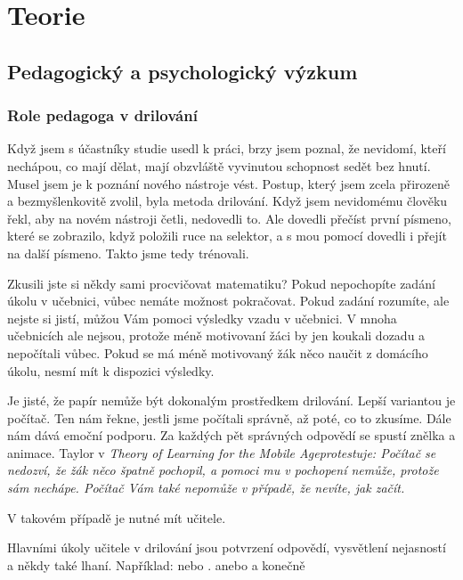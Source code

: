 \chapter{Teorie}

\section{Pedagogický a psychologický výzkum}

\subsection{Role pedagoga v drilování}

Když jsem s účastníky studie usedl k práci, brzy jsem poznal, že nevidomí, kteří nechápou, co mají dělat, mají obzvláště vyvinutou schopnost sedět bez hnutí.  Musel jsem je k poznání nového nástroje vést.  Postup, který jsem zcela přirozeně a bezmyšlenkovitě zvolil, byla metoda drilování.  Když jsem nevidomému člověku řekl, aby na novém nástroji četli, nedovedli to.  Ale dovedli přečíst první písmeno, které se zobrazilo, když položili ruce na selektor, a s mou pomocí dovedli i přejít na další písmeno.  Takto jsme tedy trénovali.

Zkusili jste si někdy sami procvičovat matematiku?  Pokud nepochopíte zadání úkolu v učebnici, vůbec nemáte možnost pokračovat.  Pokud zadání rozumíte, ale nejste si jistí, můžou Vám pomoci výsledky vzadu v učebnici.  V mnoha učebnicích ale nejsou, protože méně motivovaní žáci by jen koukali dozadu a nepočítali vůbec.  Pokud se má méně motivovaný žák něco naučit z domácího úkolu, nesmí mít k dispozici výsledky.

Je jisté, že papír nemůže být dokonalým prostředkem drilování.  Lepší variantou je počítač.  Ten nám řekne, jestli jsme počítali správně, až poté, co to zkusíme.  Dále nám dává emoční podporu.  Za každých pět správných odpovědí se spustí znělka a animace. Taylor v \em Theory of Learning for the Mobile Age\em protestuje: Počítač se nedozví, že žák něco špatně pochopil, a pomoci mu v pochopení nemůže, protože sám nechápe\citep{taylor2010theory}. Počítač Vám také nepomůže v případě, že nevíte, jak začít.

V takovém případě je nutné mít učitele.

Hlavními úkoly učitele v drilování jsou potvrzení odpovědí, vysvětlení nejasností a někdy také lhaní.  Například:  nebo .  anebo  a konečně 

